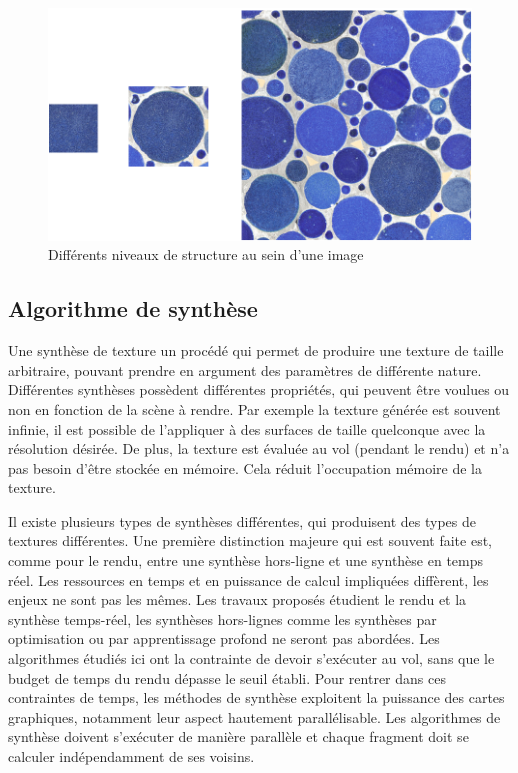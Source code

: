 \begin{figure}
    \centering
    \includegraphics[width=.85\linewidth]{contenu/resources/images/structure_level}
    \caption{Différents niveaux de structure au sein d'une image}
    \label{fig:structure-level}
\end{figure}

\subsection{Algorithme de synthèse}

Une synthèse de texture un procédé qui permet de produire une texture de taille arbitraire, pouvant prendre en argument des paramètres de différente nature. Différentes synthèses possèdent différentes propriétés, qui peuvent être voulues ou non en fonction de la scène à rendre. Par exemple la texture générée est souvent infinie, il est possible de l'appliquer à des surfaces de taille quelconque avec la résolution désirée. De plus, la texture est évaluée au vol (pendant le rendu) et n'a pas besoin d'être stockée en mémoire. Cela réduit l'occupation mémoire de la texture.

\bigskip

Il existe plusieurs types de synthèses différentes, qui produisent des types de textures différentes. Une première distinction majeure qui est souvent faite est, comme pour le rendu, entre une synthèse hors-ligne et une synthèse en temps réel. Les ressources en temps et en puissance de calcul impliquées diffèrent, les enjeux ne sont pas les mêmes. Les travaux proposés étudient le rendu et la synthèse temps-réel, les synthèses hors-lignes comme les synthèses par optimisation ou par apprentissage profond ne seront pas abordées. Les algorithmes étudiés ici ont la contrainte de devoir s'exécuter au vol, sans que le budget de temps du rendu dépasse le seuil établi. Pour rentrer dans ces contraintes de temps, les méthodes de synthèse exploitent la puissance des cartes graphiques, notamment leur aspect hautement parallélisable. Les algorithmes de synthèse doivent s'exécuter de manière parallèle et chaque fragment doit se calculer indépendamment de ses voisins.

